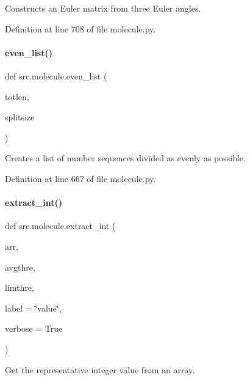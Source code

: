 Constructs an Euler matrix from three Euler angles. 



Definition at line 708 of file molecule.\+py.

\mbox{\label{namespacesrc_1_1molecule_a097327ba25a338d642f7ab11dadb55cc}} 
\paragraph{\texorpdfstring{even\+\_\+list()}{even\_list()}}
{\footnotesize\ttfamily def src.\+molecule.\+even\+\_\+list (\begin{DoxyParamCaption}\item[{}]{totlen,  }\item[{}]{splitsize }\end{DoxyParamCaption})}



Creates a list of number sequences divided as evenly as possible. 



Definition at line 667 of file molecule.\+py.

\mbox{\label{namespacesrc_1_1molecule_a926fcd7399f5becbd07f69cff154dca7}} 
\paragraph{\texorpdfstring{extract\+\_\+int()}{extract\_int()}}
{\footnotesize\ttfamily def src.\+molecule.\+extract\+\_\+int (\begin{DoxyParamCaption}\item[{}]{arr,  }\item[{}]{avgthre,  }\item[{}]{limthre,  }\item[{}]{label = {\ttfamily \char`\"{}value\char`\"{}},  }\item[{}]{verbose = {\ttfamily True} }\end{DoxyParamCaption})}



Get the representative integer value from an array. 

